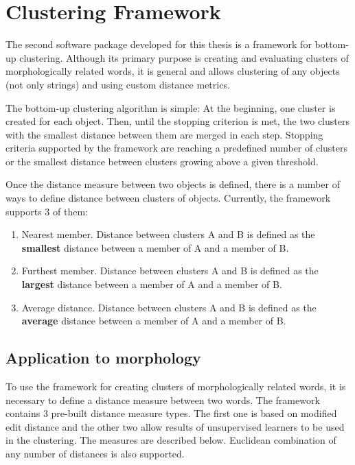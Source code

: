 \chapter{Clustering Framework}\label{chapter:clustering}

The second software package developed for this thesis is a framework for bottom-up clustering. Although its primary purpose is creating and evaluating clusters of morphologically related words, it is general and allows clustering of any objects (not only strings) and using custom distance metrics. 

The bottom-up clustering algorithm is simple: At the beginning, one cluster is created for each object. Then, until the stopping criterion is met, the two clusters with the smallest distance between them are merged in each step. Stopping criteria supported by the framework are reaching a predefined number of clusters or the smallest distance between clusters growing above a given threshold. 

Once the distance measure between two objects is defined, there is a number of ways to define distance between clusters of objects. Currently, the framework supports 3 of them:
\begin{enumerate}
\item Nearest member. Distance between clusters A and B is defined as the \textbf{smallest} distance between a member of A and a member of B.
\item Furthest member. Distance between clusters A and B is defined as the \textbf{largest} distance between a member of A and a member of B.
\item Average distance. Distance between clusters A and B is defined as the \textbf{average} distance between a member of A and a member of B. 
\end{enumerate}

\section{Application to morphology}

To use the framework for creating clusters of morphologically related words, it is necessary to define a distance measure between two words. The framework contains 3 pre-built distance measure types. The first one is based on modified edit distance and the other two allow results of unsupervised learners to be used in the clustering. The measures are described below. Euclidean combination of any number of distances is also supported.

